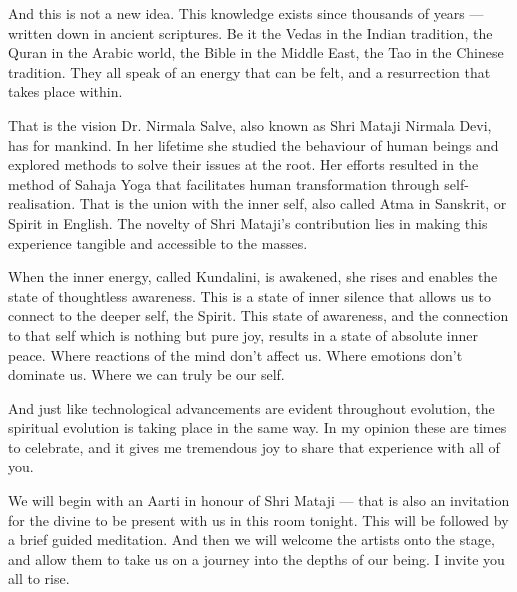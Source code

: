 \documentclass[12pt]{article}
\begin{document}
And this is not a new idea. This knowledge exists since thousands of years — written down in
ancient scriptures. Be it the Vedas in the Indian tradition, the Quran in the Arabic world, the Bible in
the Middle East, the Tao in the Chinese tradition. They all speak of an energy that can be felt, and a
resurrection that takes place within.

That is the vision Dr. Nirmala Salve, also known as Shri Mataji Nirmala Devi, has for mankind. In
her lifetime she studied the behaviour of human beings and explored methods to solve their issues at
the root. Her efforts resulted in the method of Sahaja Yoga that facilitates human transformation
through self-realisation. That is the union with the inner self, also called Atma in Sanskrit, or Spirit
in English. The novelty of Shri Mataji's contribution lies in making this experience tangible and
accessible to the masses.

When the inner energy, called Kundalini, is awakened, she rises and enables the state of thoughtless
awareness. This is a state of inner silence that allows us to connect to the deeper self, the Spirit.
This state of awareness, and the connection to that self which is nothing but pure joy, results in a
state of absolute inner peace. Where reactions of the mind don't affect us. Where emotions don't
dominate us. Where we can truly be our self.

And just like technological advancements are evident throughout evolution, the spiritual evolution
is taking place in the same way. In my opinion these are times to celebrate, and it gives me
tremendous joy to share that experience with all of you.

We will begin with an Aarti in honour of Shri Mataji — that is also an invitation for the divine to be
present with us in this room tonight. This will be followed by a brief guided meditation. And then
we will welcome the artists onto the stage, and allow them to take us on a journey into the depths of
our being.
I invite you all to rise.
\end{document}
